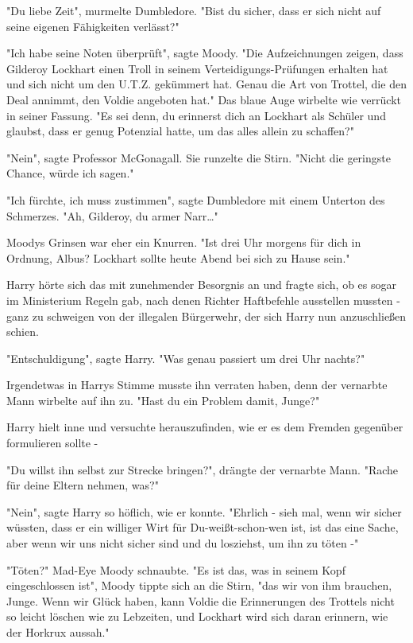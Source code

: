 {"Du liebe Zeit", murmelte Dumbledore. "Bist du sicher, dass er sich nicht auf seine eigenen Fähigkeiten verlässt?"

"Ich habe seine Noten überprüft", sagte Moody. "Die Aufzeichnungen zeigen, dass Gilderoy Lockhart einen Troll in seinem Verteidigungs-Prüfungen erhalten hat und sich nicht um den U.T.Z. gekümmert hat. Genau die Art von Trottel, die den Deal annimmt, den Voldie angeboten hat." Das blaue Auge wirbelte wie verrückt in seiner Fassung. "Es sei denn, du erinnerst dich an Lockhart als Schüler und glaubst, dass er genug Potenzial hatte, um das alles allein zu schaffen?"

"Nein", sagte Professor McGonagall. Sie runzelte die Stirn. "Nicht die geringste Chance, würde ich sagen."

"Ich fürchte, ich muss zustimmen", sagte Dumbledore mit einem Unterton des Schmerzes. "Ah, Gilderoy, du armer Narr…"

Moodys Grinsen war eher ein Knurren. "Ist drei Uhr morgens für dich in Ordnung, Albus? Lockhart sollte heute Abend bei sich zu Hause sein."

Harry hörte sich das mit zunehmender Besorgnis an und fragte sich, ob es sogar im Ministerium Regeln gab, nach denen Richter Haftbefehle ausstellen mussten - ganz zu schweigen von der illegalen Bürgerwehr, der sich Harry nun anzuschließen schien.

"Entschuldigung", sagte Harry. "Was genau passiert um drei Uhr nachts?"

Irgendetwas in Harrys Stimme musste ihn verraten haben, denn der vernarbte Mann wirbelte auf ihn zu. "Hast du ein Problem damit, Junge?"

Harry hielt inne und versuchte herauszufinden, wie er es dem Fremden gegenüber formulieren sollte -

"Du willst ihn selbst zur Strecke bringen?", drängte der vernarbte Mann. "Rache für deine Eltern nehmen, was?"

"Nein", sagte Harry so höflich, wie er konnte. "Ehrlich - sieh mal, wenn wir sicher wüssten, dass er ein williger Wirt für Du-weißt-schon-wen ist, ist das eine Sache, aber wenn wir uns nicht sicher sind und du losziehst, um ihn zu töten -"

"Töten?" Mad-Eye Moody schnaubte. "Es ist das, was in seinem Kopf eingeschlossen ist", Moody tippte sich an die Stirn, "das wir von ihm brauchen, Junge. Wenn wir Glück haben, kann Voldie die Erinnerungen des Trottels nicht so leicht löschen wie zu Lebzeiten, und Lockhart wird sich daran erinnern, wie der Horkrux aussah."

}
